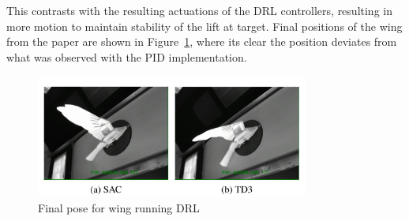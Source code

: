 This contrasts with the resulting actuations of the DRL controllers, resulting in more motion to maintain stability of the lift at target. Final positions of the wing from the paper are shown in Figure~\ref{fig:wing_DRL}, where its clear the position deviates from what was observed with the PID implementation.

\begin{figure}[h]
    \begin{center}
        \includegraphics[width=0.8\textwidth]{./img/wing_DRL.png}
    \end{center}
    \caption{Final pose for wing running DRL}\label{fig:wing_DRL}
\end{figure}


